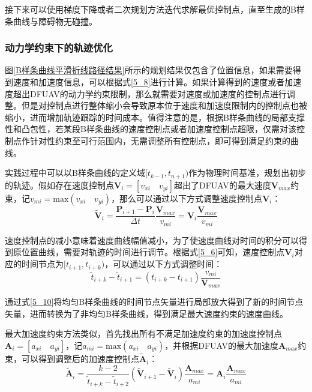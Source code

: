 接下来可以使用梯度下降或者二次规划方法迭代求解最优控制点，直至生成的B样条曲线与障碍物无碰撞。

\subsubsection{动力学约束下的轨迹优化}

图\ref{B样条曲线平滑折线路径结果}所示的规划结果仅包含了位置信息，如果需要得到速度和加速度信息，可以根据式\eqref{5_8}进行计算。如果计算得到的速度或者加速度超出DFUAV的动力学约束限制，那么就需要对速度或加速度的控制点进行调整。但是对控制点进行整体缩小会导致原本位于速度和加速度限制内的控制点也被缩小，进而增加轨迹跟踪的时间成本。值得注意的是，根据B样条曲线的局部支撑性和凸包性，若某段B样条曲线的速度控制点或者加速度控制点超限，仅需对该控制点作针对性约束至可行范围内，无需调整所有控制点，即可得到满足约束的曲线。

实践过程中可以以B样条曲线的定义域$[t_{k-1},t_{n+1})$作为物理时间基准，规划出初步的轨迹。假如存在速度控制点$\boldsymbol{V}_i=[v_{xi}\quad v_{yi}]$超出了DFUAV的最大速度$\boldsymbol{V}_{max}$约束，记$v_{mi} = \text{max}(v_{xi}\quad v_{yi})$，那么可以通过以下方式调整速度控制点$\boldsymbol{V}_i$：
\begin{equation}
    \widetilde{\boldsymbol{V}}_i=\frac{\boldsymbol{P}_{i+1}-\boldsymbol{P}_{i}}{\Delta t}\frac{\boldsymbol{V}_{max}}{v_{mi}}=\boldsymbol{V}_i\frac{\boldsymbol{V}_{max}}{v_{mi}}
    \label{5_9}
\end{equation}

速度控制点的减小意味着速度曲线幅值减小，为了使速度曲线对时间的积分可以得到原位置曲线，需要对轨迹的时间进行调节。根据式\eqref{5_6}可知，速度控制点$\boldsymbol{V}_i$对应的时间节点为$[t_{i+1},t_{i+k})$，可以通过以下方式调整时间：
\begin{equation}
    \widetilde{t}_{i+k}-\widetilde{t}_{i+1}=({t}_{i+k}-{t}_{i+1})\frac{v_{mi}}{\boldsymbol{V}_{max}}
    \label{5_10}
\end{equation}

通过式\eqref{5_10}将均匀B样条曲线的时间节点矢量进行局部放大得到了新的时间节点矢量，进而转换为了非均匀B样条曲线，得到满足最大速度约束的速度曲线。

最大加速度约束方法类似，首先找出所有不满足加速度约束的加速度控制点$\boldsymbol{A}_i=[a_{xi}\quad a_{yi}]$，记$a_{mi} = \text{max}(a_{xi}\quad a_{yi})$，并根据DFUAV的最大加速度$\boldsymbol{A}_{max}$约束，可以得到调整后的加速度控制点$\widetilde{\boldsymbol{A}}_i$：
\begin{equation}
    \widetilde{\boldsymbol{A}}_i=\frac{k-2}{\widetilde{t}_{i+k}-\widetilde{t}_{i+2}}(\widetilde{\boldsymbol{V}}_{i+1}-\widetilde{\boldsymbol{V}}_{i})\frac{\boldsymbol{A}_{max}}{a_{mi}}
    =\boldsymbol{A}_i\frac{\boldsymbol{A}_{max}}{a_{mi}}
    \label{5_11}
\end{equation}

